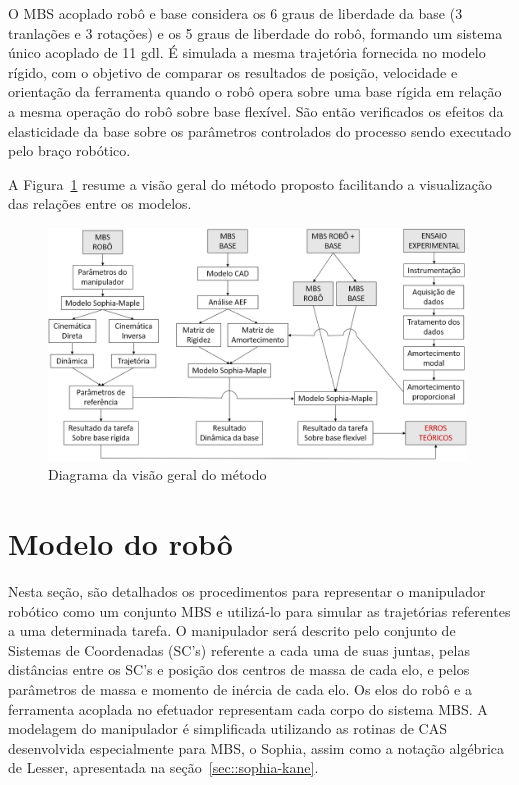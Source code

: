 O MBS acoplado robô e base considera os 6 graus de liberdade da base (3
tranlações e 3 rotações) e os 5 graus de liberdade do robô, formando um sistema
único acoplado de 11 gdl. É simulada a mesma trajetória fornecida no modelo
rígido, com o objetivo de comparar os resultados de posição, velocidade e
orientação da ferramenta quando o robô opera sobre uma base rígida em relação a
mesma operação do robô sobre base flexível. São então verificados os efeitos da
elasticidade da base sobre os parâmetros controlados do processo sendo
executado pelo braço robótico.

A Figura~\ref{fig::visgeral} resume a visão geral
do método proposto facilitando a visualização das relações entre os modelos.

\begin{figure}[h]
	\centering 
 	\includegraphics[width=0.99\textwidth]{figs/visgeral}
 	\caption{Diagrama da visão geral do método}
 	\label{fig::visgeral}
\end{figure}



\section{Modelo do robô} \label{sec::robo}

Nesta seção, são detalhados os procedimentos para representar o manipulador
robótico como um conjunto MBS e utilizá-lo para simular as trajetórias
referentes a uma determinada tarefa. O manipulador será descrito pelo conjunto
de Sistemas de Coordenadas (SC's) referente a cada uma de suas juntas, pelas
distâncias entre os SC's e posição dos centros de massa de cada elo, e pelos
parâmetros de massa e momento de inércia de cada elo. Os elos do robô e a
ferramenta acoplada no efetuador representam cada corpo do sistema MBS. A
modelagem do manipulador é simplificada utilizando as rotinas de CAS
desenvolvida especialmente para MBS, o Sophia, assim como a notação algébrica de
Lesser, apresentada na seção~\ref{sec::sophia-kane}.

